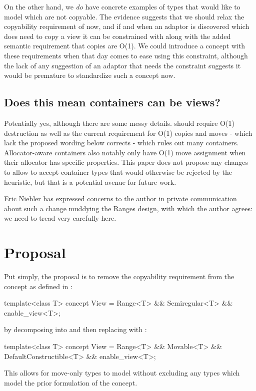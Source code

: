 On the other hand, we \emph{do} have concrete examples of types
that would like to model 
which are not copyable. The evidence suggests that we should relax the
copyability requirement of  now, and if and when an adaptor is
discovered which does need to copy a view it can be constrained with
 along with the added semantic requirement that
copies are O(1). We could introduce a  concept with these
requirements when that day comes to ease using this constraint, although the
lack of any suggestion of an adaptor that needs the constraint suggests it would
be premature to standardize such a concept now.

\section{Does this mean containers can be views?}
Potentially yes, although there are some messy details.  should
require O(1) destruction as well as the current requirement for O(1) copies and
moves - which lack the proposed wording below corrects - which rules out many
containers. Allocator-aware containers also notably only have O(1) move assignment when
their allocator has specific properties. This paper does not propose any changes
to allow  to accept container types that would otherwise be rejected
by the  heuristic, but that is a potential avenue for future
work.

Eric Niebler has expressed concerns to the author in private communication about
such a change muddying the Ranges design, with which the author agrees: we need
to tread very carefully here.


\chapter{Proposal}
Put simply, the proposal is to remove the copyability requirement from the
 concept as defined in :
\begin{codeblock}
template<class T>
  concept View =
    Range<T> && Semiregular<T> && enable_view<T>;
\end{codeblock}
by decomposing  into  and then replacing  with
:
\begin{codeblock}
template<class T>
  concept View =
    Range<T> && Movable<T> && DefaultConstructible<T> && enable_view<T>;
\end{codeblock}
This allows for move-only types to model  without excluding any
types which model the prior formulation of the concept.

